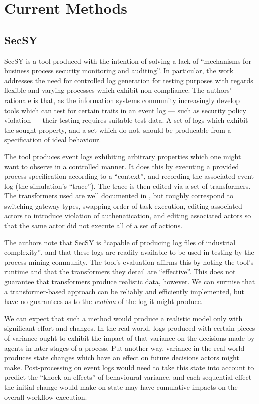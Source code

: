 \documentclass[12pt,draft]{article}
\begin{document}
\section{Current Methods}


\subsection{SecSY}
SecSY is a tool produced with the intention of solving a lack of
``mechanisms for business process security monitoring and auditing''. In
particular, the work addresses the need for controlled log generation for
testing purposes with regards flexible and varying processes which exhibit
non-compliance. The authors' rationale is that, as the information systems
community increasingly develop tools which can test for certain traits in an
event log --- such as security policy violation --- their testing requires
suitable test data. A set of logs which exhibit the sought property, and a set
which do not, should be producable from a specification of ideal behaviour.
\par

The tool produces event logs exhibiting arbitrary properties which one might
want to observe in a controlled manner. It does this by executing a provided
process specification according to a ``context'', and recording the associated
event log (the simulation's ``trace''). The trace is then edited via a set of
transformers. The transformers used are well documented in , but
roughly correspond to switching gateway types, swapping order of task execution,
editing associated actors to introduce violation of authenatication, and editing
associated actors so that the same actor did not execute all of a set of
actions.
\par

The authors note that SecSY is ``capable of producing log files of industrial
complexity'', and that these logs are readily available to be used in testing by
the process mining community. The tool's evaluation affirms this by noting the
tool's runtime and that the transformers they detail are ``effective''. This
does not guarantee that transformers produce realistic data, however. We can
surmise that a transformer-based approach can be reliably and efficiently
implemented, but have no guarantees as to the \emph{realism} of the log it might
produce.
\par

We can expect that such a method would produce a realistic model only with
significant effort and changes. In the real world, logs produced with certain
pieces of variance ought to exhibit the impact of that variance on the decisions
made by agents in later stages of a process. Put another way, variance in the
real world produces state changes which have an effect on future decisions
actors might make. Post-processing on event logs would need to take this state
into account to predict the ``knock-on effects'' of behavioural variance, and
each sequential effect the initial change would make on state may have
cumulative impacts on the overall workflow execution.
\par
\end{document}

